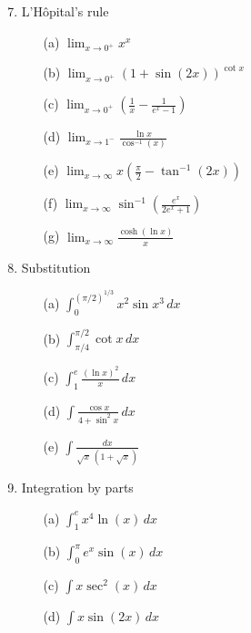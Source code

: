 \documentclass[12pt]{article}
\begin{document}
\begin{enumerate}
\setcounter{enumi}{6}
\item L'H\^opital's rule
\begin{enumerate}
\item[(a)] $\lim_{x\to0^+}x^x$

\item[(b)] $\lim_{x\to0^+}(1+\sin(2x))^{\cot x}$

\item[(c)] $\lim_{x\to0^+}\left(\frac1x-\frac{1}{e^x-1}\right)$

\item[(d)] $\lim_{x\to1^-}\frac{\ln x}{\cos^{-1}(x)}$

\item[(e)] $\lim_{x\to\infty}x\left(\frac{\pi}{2}-\tan^{-1}(2x)\right)$

\item[(f)] $\lim_{x\to\infty}\sin^{-1}\left(\frac{e^x}{2e^x+1}\right)$

\item[(g)] $\lim_{x\to\infty}\frac{\cosh(\ln x)}{x}$

\end{enumerate}

\setcounter{enumi}{7}
\item Substitution
\begin{enumerate}
\item[(a)] $\int_0^{(\pi/2)^{1/3}}x^2\sin x^3\,dx$

\item[(b)] $\int_{\pi/4}^{\pi/2}\cot x\,dx$

\item[(c)] $\int_1^e\frac{(\ln x)^2}{x}\,dx$

\item[(d)] $\int\frac{\cos x}{4+\sin^2x}\,dx$

\item[(e)] $\int\frac{dx}{\sqrt x\,(1+\sqrt x)}$

\end{enumerate}

\setcounter{enumi}{8}
\item Integration by parts
\begin{enumerate}
\item[(a)] $\int_1^e x^4\ln(x)\,dx$

\item[(b)] $\int_0^\pi e^x\sin(x)\,dx$

\item[(c)] $\int x\sec^2(x)\,dx$

\item[(d)] $\int x\sin(2x)\,dx$


\end{enumerate}
\end{enumerate}
\end{document}
